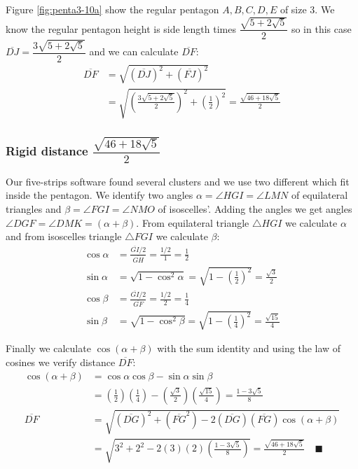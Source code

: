 \documentclass[11pt]{article}
\begin{document}
Figure \ref{fig:penta3-10a} show the regular pentagon $A,B,C,D,E$ of size $3$. We know the regular pentagon height is side length times $\dfrac{\sqrt{5+2\sqrt5}}2$ so in this case $\overline{DJ} = \dfrac{3\sqrt{5+2\sqrt5}}2$ and we can calculate $\overline{DF}$:
\begin{align}
\overline{DF} &= \sqrt{(\overline{DJ})^2 + (\overline{FJ})^2}\nonumber\\
 &= \sqrt{\left(\frac{3\sqrt{5+2\sqrt5}}2\right)^2 + \left(\frac{1}2\right)^2}
 = \frac{\sqrt{46+18\sqrt5}}2
\end{align}

\subsubsection{Rigid distance $\dfrac{\sqrt{46+18\sqrt5}}2$}

Our five-strips software found several clusters and we use two different which fit inside the pentagon. We identify two angles $\alpha = \angle{HGI} = \angle{LMN}$ of equilateral triangles and $\beta = \angle{FGI} = \angle{NMO}$ of isoscelles'. Adding the angles we get angles $\angle{DGF} = \angle{DMK} = (\alpha + \beta)$. From equilateral triangle $\triangle{HGI}$ we calculate $\alpha$ and from isoscelles triangle $\triangle{FGI}$ we calculate $\beta$:
\begin{align}
\cos\alpha &= \frac{\overline{GI} / 2}{\overline{GH}} = \frac{1 / 2}1 = \frac{1}2\\
\sin\alpha &= \sqrt{1 - \cos^2\alpha} = \sqrt{1 - \left(\frac{1}2\right)^2} = \frac{\sqrt3}2\\
%
\cos\beta &= \frac{\overline{GI} / 2}{\overline{GF}} = \frac{1 / 2}2 = \frac{1}4\\
\sin\beta &= \sqrt{1 - \cos^2\beta} = \sqrt{1 - \left(\frac{1}4\right)^2} = \frac{\sqrt{15}}4
\end{align}

Finally we calculate $\cos(\alpha+\beta)$ with the sum identity and using the law of cosines we verify distance $\overline{DF}$:
\begin{align}
\cos(\alpha+\beta) &= \cos\alpha\cos\beta - \sin\alpha\sin\beta \nonumber\\
 &= \left(\frac{1}2\right)\left(\frac{1}4\right)
  -\left(\frac{\sqrt3}2\right)\left(\frac{\sqrt{15}}4\right)
 = \frac{1 - 3\sqrt5}8 \\
\overline{DF} &= \sqrt{(\overline{DG})^2 + (\overline{FG}^2)
 - 2(\overline{DG})(\overline{FG})\cos(\alpha+\beta)} \nonumber\\
 &= \sqrt{3^2 + 2^2 - 2(3)(2)\left(\frac{1 - 3\sqrt5}8\right)}
 = \frac{\sqrt{46+18\sqrt5}}2 \quad\blacksquare
\end{align}
\end{document}

